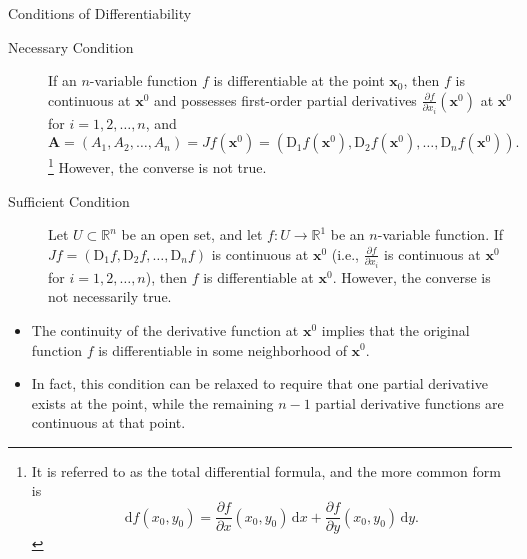 \documentclass[11pt]{../../TexTemplate/elegantbook}
\begin{document}
\begin{theorem}{Conditions of Differentiability}
    \begin{description}
        \item[Necessary Condition] If an \(n\)-variable function \(f\) is differentiable at the point \(\mathbf{x}_{0}\), 
        then \(f\) is continuous at \(\mathbf{x}^{0}\) and 
        possesses first-order partial derivatives \(\frac{\partial f}{\partial x_{i}}(\mathbf{x}^{0})\) 
        at \(\mathbf{x}^{0}\) for \(i = 1, 2, \dots, n\), and
        \[
        \mathbf{A} = \left( A_{1}, A_{2}, \dots, A_{n} \right)  = Jf(\mathbf{x}^{0}) = 
        \left(\mathrm{D}_{1}f(\mathbf{x}^{0}), \mathrm{D}_{2}f(\mathbf{x}^{0}), \dots, \mathrm{D}_{n}f(\mathbf{x}^{0}) \right).
        \]\footnote{
            It is referred to as the total differential formula, and the more common form is
            \[
                \mathrm{d}f(x_{0},y_{0})=
                \frac{\partial f}{\partial x}(x_{0},y_{0})\,\mathrm{d}x+\frac{\partial f}{\partial y}(x_{0},y_{0})\,\mathrm{d}y.
            \]
        }
        However, the converse is not true.
        \item[Sufficient Condition] Let \(U \subset \mathbb{R}^n\) be an open set, 
        and let \(f: U \to \mathbb{R}^1\) be an \(n\)-variable function. 
        If \(Jf = \left( \mathrm{D}_{1}f, \mathrm{D}_{2}f, \dots, \mathrm{D}_{n}f \right)\) 
        is continuous at \(\mathbf{x}^{0}\) 
        (i.e., \(\frac{\partial f}{\partial x_{i}}\) is continuous at \(\mathbf{x}^{0}\) for \(i = 1, 2, \dots, n\)), 
        then \(f\) is differentiable at \(\mathbf{x}^{0}\).
        However, the converse is not necessarily true.
    \end{description}    
\end{theorem}

\begin{note}
    \begin{itemize}
        \item The continuity of the derivative function at \(\mathbf{x}^{0}\) implies that 
            the original function \(f\) is differentiable in some neighborhood of \(\mathbf{x}^{0}\).
        \item In fact, this condition can be relaxed to require that one partial derivative exists at the point, 
            while the remaining \(n-1\) partial derivative functions are continuous at that point.
    \end{itemize}
\end{note}
\end{document}
